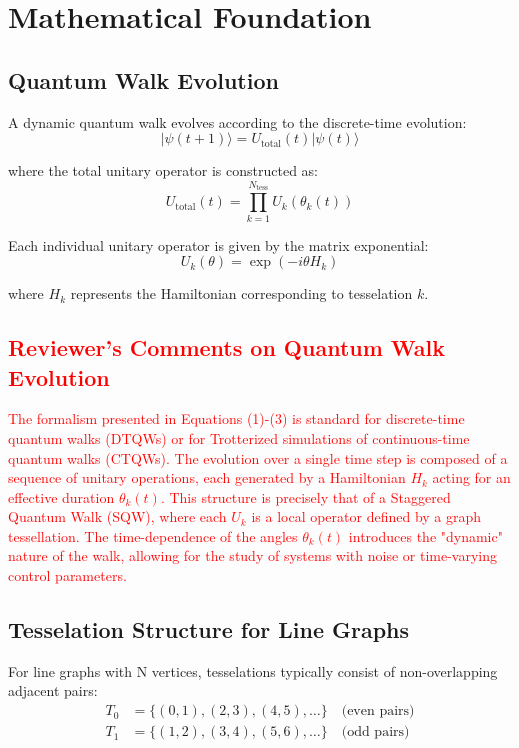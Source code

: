 \documentclass[11pt,a4paper]{article}
\newcommand{\ket}[1]{|#1\rangle}
\begin{document}
\section{Mathematical Foundation}

\subsection{Quantum Walk Evolution}

A dynamic quantum walk evolves according to the discrete-time evolution:
\begin{equation}
\ket{\psi(t+1)} = U_{\text{total}}(t) \ket{\psi(t)}
\end{equation}

where the total unitary operator is constructed as:
\begin{equation}
U_{\text{total}}(t) = \prod_{k=1}^{N_{\text{tess}}} U_k(\theta_k(t))
\end{equation}

Each individual unitary operator is given by the matrix exponential:
\begin{equation}
U_k(\theta) = \exp(-i\theta H_k)
\end{equation}

where $H_k$ represents the Hamiltonian corresponding to tesselation $k$.

\textcolor{red}{
\subsection*{Reviewer's Comments on Quantum Walk Evolution}
The formalism presented in Equations (1)-(3) is standard for discrete-time quantum walks (DTQWs) or for Trotterized simulations of continuous-time quantum walks (CTQWs). The evolution over a single time step is composed of a sequence of unitary operations, each generated by a Hamiltonian $H_k$ acting for an effective duration $\theta_k(t)$. This structure is precisely that of a Staggered Quantum Walk (SQW), where each $U_k$ is a local operator defined by a graph tessellation. The time-dependence of the angles $\theta_k(t)$ introduces the "dynamic" nature of the walk, allowing for the study of systems with noise or time-varying control parameters.
}

\subsection{Tesselation Structure for Line Graphs}

For line graphs with N vertices, tesselations typically consist of non-overlapping adjacent pairs:
\begin{align}
T_0 &= \{(0,1), (2,3), (4,5), \ldots\} \quad \text{(even pairs)}\\
T_1 &= \{(1,2), (3,4), (5,6), \ldots\} \quad \text{(odd pairs)}
\end{align}
\end{document}
